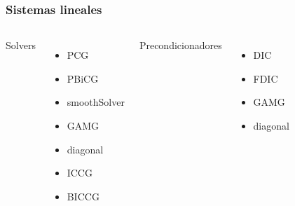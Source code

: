 \begin{frame}
    \frametitle{Sistemas lineales}
    
    
    \begin{columns}
    
        Solvers    
        \begin{itemize}
            \item PCG
            \item PBiCG
            \item smoothSolver
            \item GAMG
            \item diagonal
            \item ICCG
            \item BICCG
        \end{itemize}
        
        
        Precondicionadores
        \begin{itemize}
            \item DIC
            \item FDIC
            \item GAMG
            \item diagonal
        \end{itemize}        
        
    \end{columns}        

\end{frame} 
